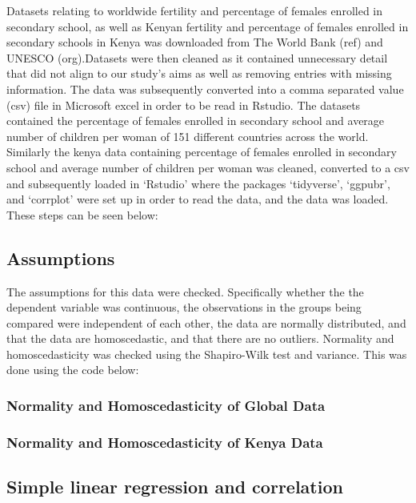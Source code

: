 \documentclass[11pt,]{article}
\begin{document}
Datasets relating to worldwide fertility and percentage of females
enrolled in secondary school, as well as Kenyan fertility and percentage
of females enrolled in secondary schools in Kenya was downloaded from
The World Bank (ref) and UNESCO (org).Datasets were then cleaned as it
contained unnecessary detail that did not align to our study's aims as
well as removing entries with missing information. The data was
subsequently converted into a comma separated value (csv) file in
Microsoft excel in order to be read in Rstudio. The datasets contained
the percentage of females enrolled in secondary school and average
number of children per woman of 151 different countries across the
world. Similarly the kenya data containing percentage of females
enrolled in secondary school and average number of children per woman
was cleaned, converted to a csv and subsequently loaded in `Rstudio'
where the packages `tidyverse', `ggpubr', and `corrplot' were set up in
order to read the data, and the data was loaded. These steps can be seen
below:

\subsection{Assumptions}\label{assumptions}

The assumptions for this data were checked. Specifically whether the the
dependent variable was continuous, the observations in the groups being
compared were independent of each other, the data are normally
distributed, and that the data are homoscedastic, and that there are no
outliers. Normality and homoscedasticity was checked using the
Shapiro-Wilk test and variance. This was done using the code below:

\subsubsection{Normality and Homoscedasticity of Global
Data}\label{normality-and-homoscedasticity-of-global-data}

\subsubsection{Normality and Homoscedasticity of Kenya
Data}\label{normality-and-homoscedasticity-of-kenya-data}

\subsection{Simple linear regression and
correlation}\label{simple-linear-regression-and-correlation}
\end{document}
